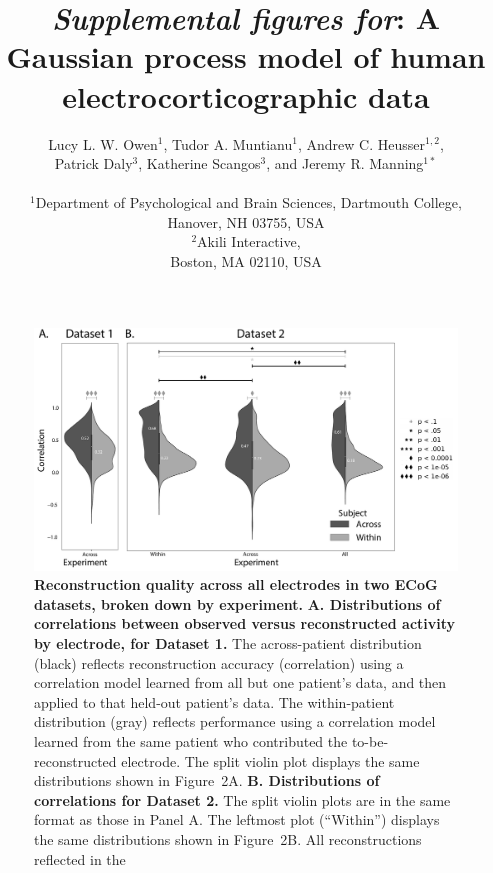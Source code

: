 \documentclass[10pt]{article}
\title{\textit{Supplemental figures for}: A Gaussian process model of human electrocorticographic data}
\author{
  Lucy L. W. Owen$^{1}$,
  Tudor A. Muntianu$^{1}$,
  Andrew C. Heusser$^{1, 2}$, \\
  Patrick Daly$^{3}$,
  Katherine Scangos$^{3}$, and
  Jeremy R. Manning$^{1\ast}$\\\\
$^{1}$Department of Psychological and Brain Sciences, Dartmouth College,\\
Hanover, NH 03755, USA\\
$^{2}$Akili Interactive,\\
Boston, MA 02110, USA}
\begin{document}
\setcounter{equation}{0}
\setcounter{figure}{0}
\setcounter{table}{0}
\setcounter{page}{1}
\setcounter{section}{0}
\makeatletter
\renewcommand{\theequation}{S\arabic{equation}}
\renewcommand{\thefigure}{S\arabic{figure}}

\newcommand{\methods}{1}
\newcommand{\corrmaps}{2}
\newcommand{\freqs}{3}
\newcommand{\density}{4}
\newcommand{\infomap}{5}
\newcommand{\infomapfreqs}{6}

\begin{titlepage}
  \maketitle
\end{titlepage}

\begin{figure}[p]
\centering
\includegraphics[width=\textwidth]{figs/supplemental_1}
\caption{\textbf{Reconstruction quality across all electrodes in two
    ECoG datasets, broken down by experiment.}
  \textbf{A. Distributions of correlations between observed versus
    reconstructed activity by electrode, for Dataset 1.}  The
  across-patient distribution (black) reflects reconstruction accuracy
  (correlation) using a correlation model learned from all but one
  patient's data, and then applied to that held-out patient's data.
  The within-patient distribution (gray) reflects performance using a
  correlation model learned from the same patient who contributed the
  to-be-reconstructed electrode.  The split violin plot displays the
  same distributions shown in Figure~\corrmaps A.
  \textbf{B. Distributions of correlations for Dataset 2.}  The split
  violin plots are in the same format as those in Panel A.  The
  leftmost plot (``Within'') displays the same distributions shown in
  Figure~\corrmaps B.  All reconstructions reflected in the
}
\end{figure}
\end{document}
